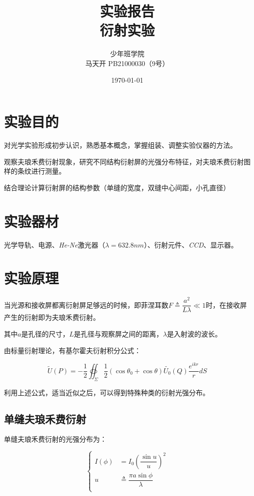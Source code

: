 \documentclass[a4paper]{ltxdoc}
\title{实验报告\\衍射实验}
\author{少年班学院\\马天开 PB21000030（9号）}
\date{\today}
\begin{document}
\begin{multicols}{2}
    \maketitle
    \section{实验目的}
    对光学实验形成初步认识，熟悉基本概念，掌握组装、调整实验仪器的方法。

    观察夫琅禾费衍射现象，研究不同结构衍射屏的光强分布特征，对夫琅禾费衍射图样的条纹进行测量。

    结合理论计算衍射屏的结构参数（单缝的宽度，双缝中心间距，小孔直径）
    \section{实验器材}
    光学导轨、电源、\textit{He-Ne}激光器（$\lambda = 632.8 nm$）、衍射元件、\textit{CCD}、显示器。
    \section{实验原理}
    当光源和接收屏都离衍射屏足够远的时候，即菲涅耳数$F\triangleq \dfrac{a^2}{L\lambda} \ll 1$时，在接收屏产生的衍射即为夫琅禾费衍射。

    其中$a$是孔径的尺寸，$L$是孔径与观察屏之间的距离，$\lambda$是入射波的波长。

    由标量衍射理论，有基尔霍夫衍射积分公式：

    $$
        \widetilde{U}(P) = -\dfrac{1}{2} \oiint _{\Sigma} \dfrac{1}{2}(\cos \theta_0 + \cos \theta)\widetilde{U_0}(Q)\dfrac{e^{ikr}}{r} dS
    $$

    利用上述公式，适当近似之后，可以得到特殊种类的衍射光强分布。

    \subsection{单缝夫琅禾费衍射}

    单缝夫琅禾费衍射的光强分布为：

    $$
        \left\{
        \begin{aligned}
            I(\phi) & = I_0 (\dfrac{\sin u}{u})^2                  \\
            u       & \triangleq \dfrac {\pi a \sin\phi} {\lambda} \\
        \end{aligned}
        \right.
    $$


\end{multicols}
\end{document}
